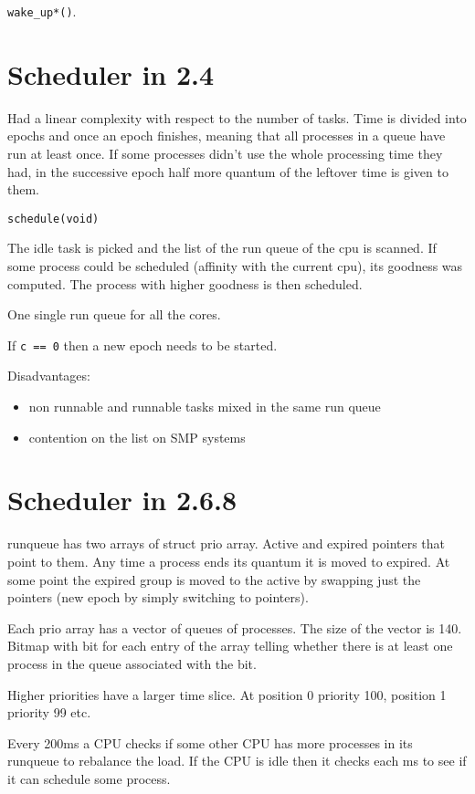 \documentclass[twoside]{article}
\begin{document}
\texttt{wake_up*()}.


\section{Scheduler in 2.4}
\label{sec:Scheduler in 2.4}

Had a linear complexity with respect to the number of tasks. Time is divided
into epochs and once an epoch finishes, meaning that all processes in a queue
have run at least once. If some processes didn't use the whole processing time
they had, in the successive epoch half more quantum of the leftover time is
given to them.

\texttt{schedule(void)}

The idle task is picked and the list of the run queue of the cpu is scanned. If
some process could be scheduled (affinity with the current cpu), its goodness
was computed. The process with higher goodness is then scheduled.

One single run queue for all the cores.

If \texttt{c == 0} then a new epoch needs to be started.

Disadvantages:

\begin{itemize}
    \item non runnable and runnable tasks mixed in the same run queue
    \item contention on the list on SMP systems
\end{itemize}

\section{Scheduler in 2.6.8}
\label{sec:Scheduler in 2.6.8}

runqueue has two arrays of struct prio array. Active and expired pointers that
point to them. Any time a process ends its quantum it is moved to expired. At
some point the expired group is moved to the active by swapping just the
pointers (new epoch by simply switching to pointers).

Each prio array has a vector of queues of processes. The size of the vector is
140. Bitmap with bit for each entry of the array telling whether there is at
least one process in the queue associated with the bit.

Higher priorities have a larger time slice. At position 0 priority 100, position
1 priority 99 etc.

Every 200ms a CPU checks if some other CPU has more processes in its runqueue to
rebalance the load. If the CPU is idle then it checks each ms to see if it can
schedule some process.
\end{document}
